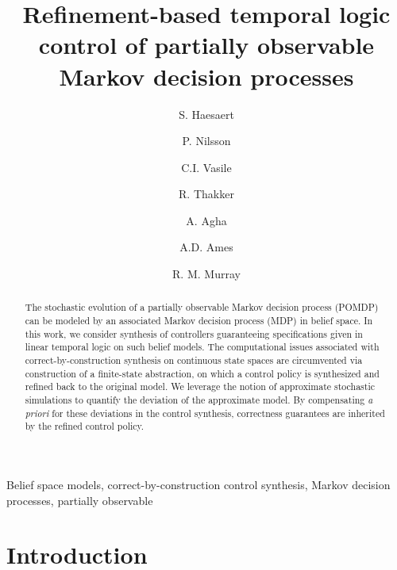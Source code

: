 \documentclass{ifacconf}
\begin{document}
\begin{frontmatter}

\title{\huge Refinement-based temporal logic control of partially observable Markov decision processes }

\author[cal]{S. Haesaert} 
\author[cal]{P. Nilsson} 
\author[mit]{C.I. Vasile}
\author[jpl]{R. Thakker}
\author[jpl]{A. Agha}
\author[cal]{A.D.  Ames}
\author[cal]{R. M. Murray}



\address[cal]{California Institute of Technology, 
   Pasadena, CA 91125 USA} %
\address[mit]{Massachusetts Institute of Technology, 
   Cambridge, MA 02139 USA}%
\address[jpl]{Jet Propulsion Laboratory, 
   Pasadena, CA 91109 USA}%
\maketitle
\begin{abstract}
The stochastic evolution of a partially observable Markov decision process (POMDP) can be modeled by an associated Markov decision process (MDP) in belief space.
In this work, we consider synthesis of controllers guaranteeing  specifications given in linear temporal logic on such belief models. The computational issues associated with correct-by-construction synthesis on continuous state spaces are circumvented via construction of a finite-state abstraction, on which a control policy is synthesized and refined back to the original model. We leverage the notion of approximate stochastic simulations to quantify the deviation of the approximate model. By compensating {\it a priori} for these deviations in the control synthesis, correctness guarantees are inherited by the refined control policy.
\end{abstract}
\begin{keyword} Belief space models,
correct-by-construction control synthesis, Markov decision processes, partially observable
\end{keyword}

\end{frontmatter}
 
\section{Introduction}
\label{subsec:intro}
\end{document}
